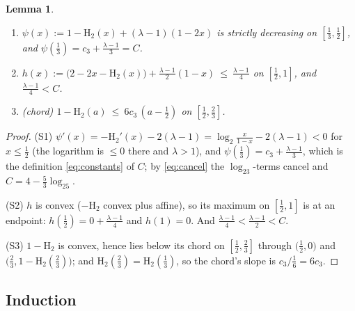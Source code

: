 \documentclass[journal]{IEEEtran}
\newtheorem{lemma}{Lemma}
\theoremstyle{definition}
\newcommand{\Hh}{\mathrm H_2}
\newcommand{\lgg}{\log_2}
\newcommand{\CC}{C}
\newcommand{\lam}{\lambda}
\newcommand{\cthree}{c_3}
\begin{document}
\begin{lemma}\label{lem:scalar}
\begin{enumerate}
\item[\textup{(S1)}] $\psi(x):=1-\Hh(x)+(\lam-1)(1-2x)$ is strictly
decreasing on $[\tfrac13,\tfrac12]$, and
$\psi(\tfrac13)=\cthree+\tfrac{\lam-1}{3}=\CC$.
\item[\textup{(S2)}] $h(x):=\bigl(2-2x-\Hh(x)\bigr)+\tfrac{\lam-1}{2}(1-x)
\ \le\ \tfrac{\lam-1}{4}$ on $[\tfrac12,1]$, and $\tfrac{\lam-1}4<\CC$.
\item[\textup{(S3)}] \textup{(chord)} $1-\Hh(a)\ \le\ 6\cthree\,(a-\tfrac12)$ on
$[\tfrac12,\tfrac23]$.
\end{enumerate}
\end{lemma}

\begin{proof}
(S1) $\psi'(x)=-\Hh'(x)-2(\lam-1)=\lgg\tfrac{x}{1-x}-2(\lam-1)<0$ for
$x\le\tfrac12$ (the logarithm is $\le0$ there and $\lam>1$), and
$\psi(\tfrac13)=\cthree+\tfrac{\lam-1}{3}$, which is the definition
\eqref{eq:constants} of $\CC$; by \eqref{eq:cancel} the $\lgg3$-terms cancel
and $\CC=4-\tfrac53\lgg5$.

(S2) $h$ is convex ($-\Hh$ convex plus affine), so its maximum on $[\tfrac12,1]$
is at an endpoint: $h(\tfrac12)=0+\tfrac{\lam-1}{4}$ and $h(1)=0$. And
$\tfrac{\lam-1}4<\tfrac{\lam-1}2<\CC$.

(S3) $1-\Hh$ is convex, hence lies below its chord on $[\tfrac12,\tfrac23]$
through $\bigl(\tfrac12,0\bigr)$ and $\bigl(\tfrac23,1-\Hh(\tfrac23)\bigr)$;
and $\Hh(\tfrac23)=\Hh(\tfrac13)$, so the chord's slope is
$\cthree/\tfrac16=6\cthree$.
\end{proof}

\subsection{Induction}\label{ss:induct}
\end{document}
